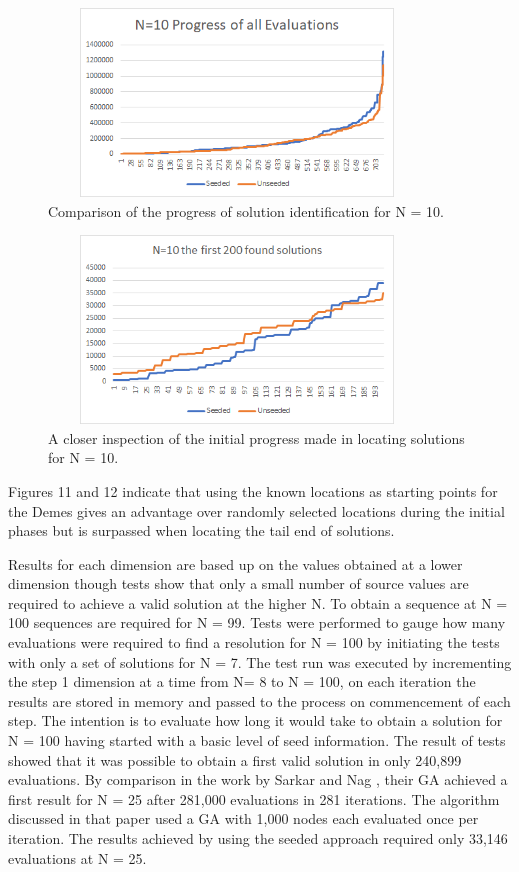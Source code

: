 \documentclass[a4paper,onecolumn,11pt]{article}
\begin{document}
\begin{figure}[!htbp]
	\centering	
	\includegraphics[width=10cm, height=5cm]{N10AllEvaluations}
	\caption{Comparison of the progress of solution identification for N = 10.}
\end{figure}

\begin{figure}[!htbp]
	\centering	
	\includegraphics[width=10cm, height=5cm]{First200Progress}
	\caption{A closer inspection of the initial progress made in locating solutions for N = 10.}
\end{figure}

Figures 11 and 12 indicate that using the known locations as starting points for the Demes gives an advantage over randomly selected locations during the initial phases but is surpassed when locating the tail end of solutions. 

Results for each dimension are based up on the values obtained at a lower dimension though tests show that only a small number of source values are required to achieve a valid solution at the higher N. To obtain a sequence at N = 100 sequences are required for N = 99. Tests were performed to gauge how many evaluations were required to find a resolution for N = 100 by initiating the tests with only a set of solutions for N = 7. The test run was executed by incrementing the step 1 dimension at a time from N= 8 to N = 100, on each iteration the results are stored in memory and passed to the process on commencement of each step. The intention is to evaluate how long it would take to obtain a solution for N = 100 having started with a basic level of seed information. The result of tests showed that it was possible to obtain a first valid solution in only 240,899 evaluations. By comparison in the work by Sarkar and Nag \cite{Adaptive}, their GA achieved a first result for N = 25 after 281,000 evaluations in 281 iterations. The algorithm discussed in that paper used a GA with 1,000 nodes each evaluated once per iteration. The results achieved by using the seeded approach required only 33,146 evaluations at N = 25.
\end{document}
